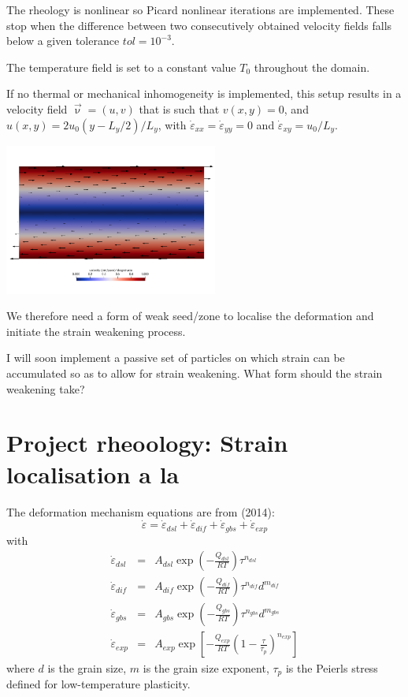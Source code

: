 The rheology is nonlinear so Picard nonlinear iterations are implemented. These stop
when the difference between two consecutively obtained velocity fields falls below
a given tolerance $tol=10^{-3}$. 

The temperature field is set to a constant value $T_0$ throughout the domain.

If no thermal or mechanical inhomogeneity is implemented, this setup results in 
a velocity field $\vec{\upnu}=(u,v)$ that is such that $v(x,y)=0$, and 
$u(x,y)=2u_0 (y-L_y/2)/L_y$, with $\dot{\varepsilon}_{xx}=\dot{\varepsilon}_{yy}=0$ 
and $\dot{\varepsilon}_{xy}=u_0/L_y$. 

\begin{center}
\includegraphics[width=7cm]{python_codes/fieldstone_121/results/vel}
\end{center}

We therefore need a form of weak seed/zone to localise the deformation and 
initiate the strain weakening process.

I will soon implement a passive set of particles on which strain can be accumulated so as 
to allow for strain weakening. What form should the strain weakening take?


\newpage
\section*{Project rheoology: Strain localisation a la \textcite{gupr14}}

The deformation mechanism equations are from \textcite{gupr14} (2014):
\[
\dot\varepsilon = \dot\varepsilon_{dsl} + \dot\varepsilon_{dif} + \dot\varepsilon_{gbs} + \dot\varepsilon_{exp} 
\]
with
\begin{eqnarray}
\dot\varepsilon_{dsl}&=&A_{dsl}\exp\left(-\frac{Q_{dsl}}{RT} \right) \tau^{n_{dsl}}  \\
\dot\varepsilon_{dif}&=&A_{dif}\exp\left(-\frac{Q_{dif}}{RT} \right) \tau^{n_{dif}} d^{m_{dif}} \\
\dot\varepsilon_{gbs}&=&A_{gbs}\exp\left(-\frac{Q_{gbs}}{RT} \right) \tau^{n_{gbs}} d^{m_{gbs}} \\
\dot\varepsilon_{exp}&=&A_{exp}\exp\left[-\frac{Q_{exp}}{RT} \left(1 -\frac{\tau}{\tau_p}\right)^{n_{exp}} \right]   
\end{eqnarray}
where $d$ is the grain size, $m$ is the grain size exponent, $\tau_p$ is the Peierls stress defined
for low-temperature plasticity.

